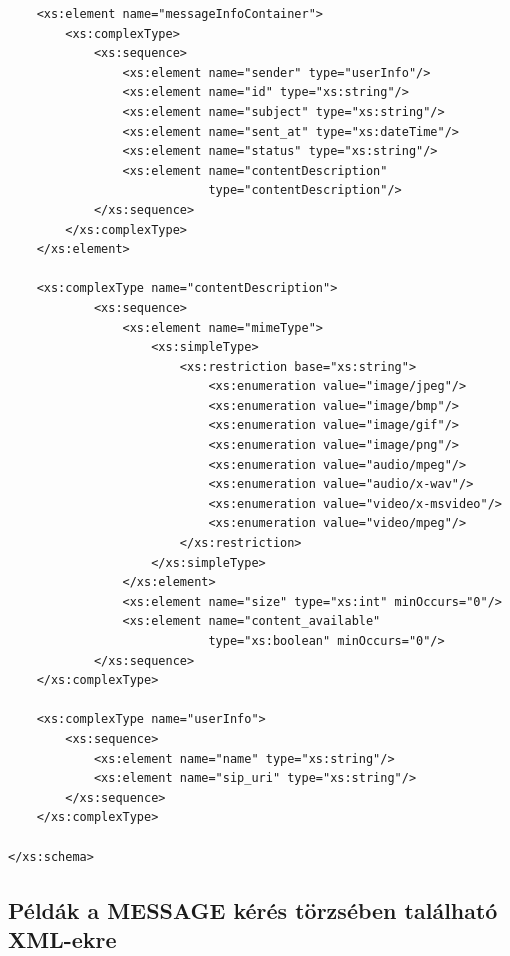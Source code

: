 \begin{verbatim}
    <xs:element name="messageInfoContainer">
        <xs:complexType>
            <xs:sequence>
                <xs:element name="sender" type="userInfo"/>                
                <xs:element name="id" type="xs:string"/>
                <xs:element name="subject" type="xs:string"/>
                <xs:element name="sent_at" type="xs:dateTime"/>
                <xs:element name="status" type="xs:string"/>
                <xs:element name="contentDescription" 
                            type="contentDescription"/>
            </xs:sequence>
        </xs:complexType>
    </xs:element>
    
    <xs:complexType name="contentDescription">
            <xs:sequence>
                <xs:element name="mimeType">
                    <xs:simpleType>
                        <xs:restriction base="xs:string">
                            <xs:enumeration value="image/jpeg"/>                                       
                            <xs:enumeration value="image/bmp"/>
                            <xs:enumeration value="image/gif"/>
                            <xs:enumeration value="image/png"/>                                     
                            <xs:enumeration value="audio/mpeg"/>
                            <xs:enumeration value="audio/x-wav"/>                               
                            <xs:enumeration value="video/x-msvideo"/>
                            <xs:enumeration value="video/mpeg"/>
                        </xs:restriction>
                    </xs:simpleType>
                </xs:element>
                <xs:element name="size" type="xs:int" minOccurs="0"/>
                <xs:element name="content_available" 
                            type="xs:boolean" minOccurs="0"/>
            </xs:sequence>        
    </xs:complexType>
    
    <xs:complexType name="userInfo">
        <xs:sequence>
            <xs:element name="name" type="xs:string"/>
            <xs:element name="sip_uri" type="xs:string"/>
        </xs:sequence>
    </xs:complexType>

</xs:schema>
\end{verbatim}
\fontsize{12}{12} 

\newpage 
\subsection{Példák a MESSAGE kérés törzsében található XML-ekre}

